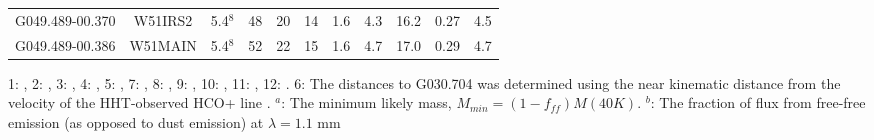 \begin{table*}
\begin{center}
\begin{tabular}{ccccccccccc}
G049.489-00.370 & W51IRS2 & 5.4$^{8}$ & 48 & 20 & 14 & 1.6 & 4.3 & 16.2 & 0.27 & 4.5 \\
G049.489-00.386 & W51MAIN & 5.4$^{8}$ & 52 & 22 & 15 & 1.6 & 4.7 & 17.0 & 0.29 & 4.7 \\
\hline
\end{tabular}
\end{center}{\scriptsize 1: \citet{Araya2002}, 2: \citet{Churchwell1990}, 3: \citet{Fish2003}, 4: \citet{Ginsburg2011}, 5: \citet{Gwinn1992}, 7: \citet{Pandian2008}, 8: \citet{Sato2010}, 9: \citet{Sewilo2004}, 10: \citet{Urquhart2012}, 11: \citet{Vig2008}, 12: \citet{Xu2003}.  6: The distances to G030.704 was determined using the
near kinematic distance from the velocity of the HHT-observed HCO+ line \citep{Schlingman2011}.
$^a$: The minimum likely mass, $M_{min} = (1-f_{ff}) M(40K)$.
$^b$: The fraction of flux from free-free emission (as opposed to dust emission) at $\lambda=1.1$ mm
}
\end{table*}
